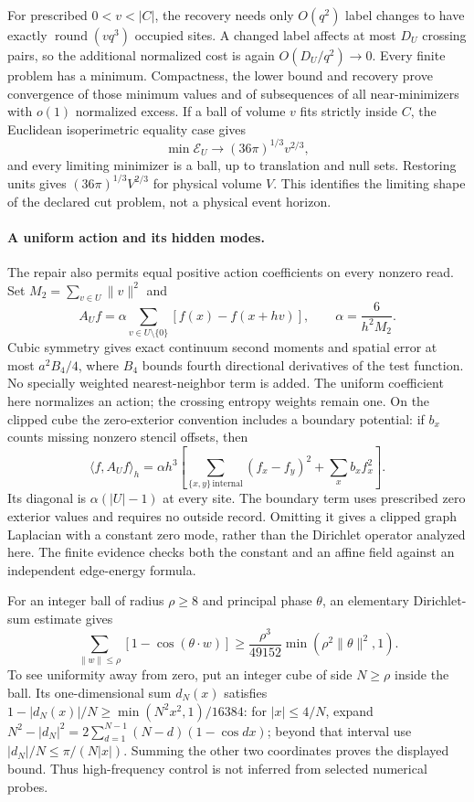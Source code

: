 For prescribed $0<v<|C|$, the recovery needs only $O(q^2)$ label changes
to have exactly $\operatorname{round}(vq^3)$ occupied sites. A changed
label affects at most $D_U$ crossing pairs, so the additional normalized
cost is again $O(D_U/q^2)\to0$. Every finite problem has a minimum.
Compactness, the lower bound and recovery prove convergence of those
minimum values and of subsequences of all near-minimizers with $o(1)$
normalized excess. If a ball of volume $v$ fits strictly inside $C$, the
Euclidean isoperimetric equality case gives
\[
 \min\mathcal E_U\longrightarrow(36\pi)^{1/3}v^{2/3},
\]
and every limiting minimizer is a ball, up to translation and null sets.
Restoring units gives $(36\pi)^{1/3}V^{2/3}$ for physical volume $V$.
This identifies the limiting shape of the declared cut problem, not a
physical event horizon.

\paragraph{A uniform action and its hidden modes.}
The repair also permits equal positive action coefficients on every nonzero
read. Set $M_2=\sum_{v\in U}\|v\|^2$ and
\[
 A_U f=\alpha\sum_{v\in U\setminus\{0\}}[f(x)-f(x+hv)],
 \qquad \alpha=\frac6{h^2M_2}.
\]
Cubic symmetry gives exact continuum second moments and spatial error
at most $a^2B_4/4$, where $B_4$ bounds fourth directional derivatives of
the test function. No specially
weighted nearest-neighbor term is added. The uniform coefficient here
normalizes an action; the crossing entropy weights remain one.
On the clipped cube the zero-exterior convention includes a boundary
potential: if $b_x$ counts missing nonzero stencil offsets, then
\[
 \langle f,A_Uf\rangle_h=\alpha h^3\left[
  \sum_{\{x,y\}\,\mathrm{internal}}(f_x-f_y)^2+\sum_x b_x f_x^2\right].
\]
Its diagonal is $\alpha(|U|-1)$ at every site. The boundary term uses
prescribed zero exterior values and requires no outside record. Omitting it
gives a clipped graph Laplacian with a constant zero mode, rather than the
Dirichlet operator analyzed here. The finite evidence checks both the
constant and an affine field against an independent edge-energy formula.

For an integer ball of radius $\rho\ge8$ and principal phase $\theta$,
an elementary Dirichlet-sum estimate gives
\[
 \sum_{\|w\|\le\rho}[1-\cos(\theta\cdot w)]
 \ge\frac{\rho^3}{49152}\min(\rho^2\|\theta\|^2,1).
\]
To see uniformity away from zero, put an integer cube of side $N\ge\rho$
inside the ball. Its one-dimensional sum $d_N(x)$ satisfies
$1-|d_N(x)|/N\ge\min(N^2x^2,1)/16384$: for $|x|\le4/N$, expand
$N^2-|d_N|^2=2\sum_{d=1}^{N-1}(N-d)(1-\cos dx)$; beyond that interval
use $|d_N|/N\le\pi/(N|x|)$. Summing the other two coordinates proves
the displayed bound. Thus high-frequency control is not inferred from
selected numerical probes.


